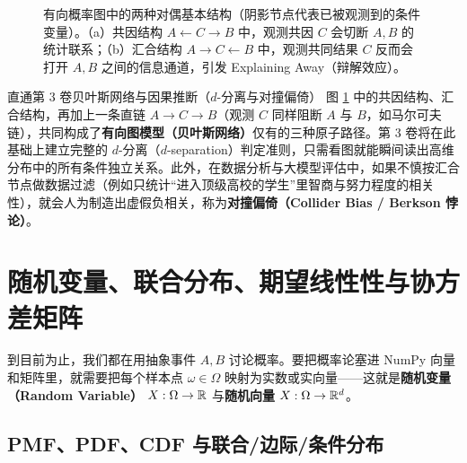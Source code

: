 \begin{figure}[htbp]
  \caption{有向概率图中的两种对偶基本结构（阴影节点代表已被观测到的条件变量）。（a）共因结构 $A \leftarrow C \rightarrow B$ 中，观测共因 $C$ 会切断 $A, B$ 的统计联系；（b）汇合结构 $A \rightarrow C \leftarrow B$ 中，观测共同结果 $C$ 反而会打开 $A, B$ 之间的信息通道，引发 Explaining Away（辩解效应）。}
  \label{fig:ch1-fork-collider}
\end{figure}

\begin{insightBox}{直通第 3 卷贝叶斯网络与因果推断（$d$-分离与对撞偏倚）}
图 \ref{fig:ch1-fork-collider} 中的共因结构、汇合结构，再加上一条直链 $A \to C \to B$（观测 $C$ 同样阻断 $A$ 与 $B$，如马尔可夫链），共同构成了\textbf{有向图模型（贝叶斯网络）}仅有的三种原子路径。第 3 卷将在此基础上建立完整的 $d$-分离（$d$-separation）判定准则，只需看图就能瞬间读出高维分布中的所有条件独立关系。此外，在数据分析与大模型评估中，如果不慎按汇合节点做数据过滤（例如只统计“进入顶级高校的学生”里智商与努力程度的相关性），就会人为制造出虚假负相关，称为\textbf{对撞偏倚（Collider Bias / Berkson 悖论）}。
\end{insightBox}

\section{随机变量、联合分布、期望线性性与协方差矩阵}
\label{sec:ch1-rv-cov}

到目前为止，我们都在用抽象事件 $A, B$ 讨论概率。要把概率论塞进 NumPy 向量和矩阵里，就需要把每个样本点 $\omega \in \Omega$ 映射为实数或实向量——这就是\textbf{随机变量（Random Variable）} $X: \Omega \to \mathbb{R}$ 与\textbf{随机向量} $X: \Omega \to \mathbb{R}^d$。

\subsection{PMF、PDF、CDF 与联合/边际/条件分布}

